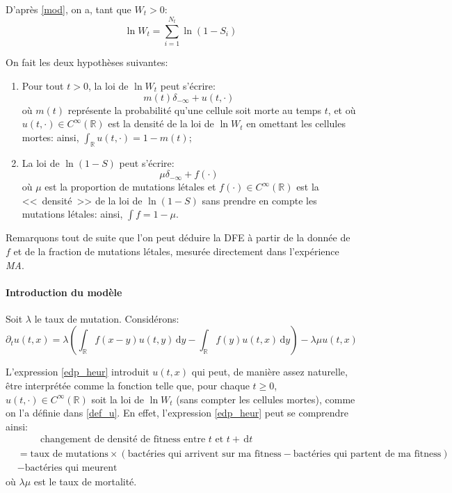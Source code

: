\documentclass[12pt]{article}
\newcounter{prop}[section]
\newcommand{\pth}[1]{\left(#1\right)}
\newcommand{\esp}{\hspace{1cm}}
\newcommand{\Er}{\mathbb{R}}
\newcommand{\de}{\,\mathrm{d}}
\newcommand{\dr}{\partial}
\begin{document}
D'après \eqref{mod}, on a, tant que $W_t>0$: \[\ln W_t=\sum_{i=1}^{N_t}\ln(1-S_i)\]

On fait les deux hypothèses suivantes:
\begin{enumerate}
\item Pour tout $t>0$, la loi de $\ln W_t$ peut s'écrire:
  \begin{equation}\label{def_u} m(t)\delta_{-\infty}+u(t,\cdot)\end{equation}
  où $m(t)$ représente la probabilité qu'une cellule soit morte au temps $t$, et où $u(t,\cdot)\in C^{\infty}(\Er)$ est la densité de la loi de $\ln W_t$ en omettant les cellules mortes: ainsi, $\int_{\Er}u(t,\cdot)=1-m(t)$;
\item La loi de $\ln (1-S)$ peut s'écrire:
  \[\mu\delta_{-\infty}+f(\cdot)\]
  où $\mu$ est la proportion de mutations létales et $f(\cdot)
  \in C^{\infty}(\Er)$ est la <<~densité~>> de la loi de $\ln(1-S)$ sans prendre en compte les mutations létales: ainsi, $\int f=1-\mu$.
\end{enumerate}

Remarquons tout de suite que l'on peut déduire la DFE à partir de la donnée de $f$ et de la fraction de mutations létales, mesurée directement dans l'expérience \emph{MA}.

\paragraph{Introduction du modèle}

Soit $\lambda$ le taux de mutation. Considérons:
\begin{equation}\label{edp_heur} \dr_tu(t,x)=\lambda\pth{\int_{\Er}f(x-y)u(t,y)\de y-\int_{\Er}f(y)u(t,x)\de y}-\lambda\mu u(t,x)\end{equation}

L'expression \eqref{edp_heur} introduit $u(t,x)$ qui peut, de manière assez naturelle, être interprétée comme la fonction telle que, pour chaque $t\geqslant 0$, $u(t,\cdot)\in C^{\infty}(\Er)$ soit la loi de $\ln W_t$ (sans compter les cellules mortes), comme on l'a définie dans \eqref{def_u}. En effet, l'expression \eqref{edp_heur} peut se comprendre ainsi:
\begin{align*}
&\esp\text{changement de densité de fitness entre $t$ et $t+\de t$}\\
&=\text{taux de mutations}\times\pth{\text{bactéries qui arrivent sur ma fitness}-\text{bactéries qui partent de ma fitness}}\\
&-\text{bactéries qui meurent}
\end{align*} 
où $\lambda\mu$ est le taux de mortalité. 
\end{document}
